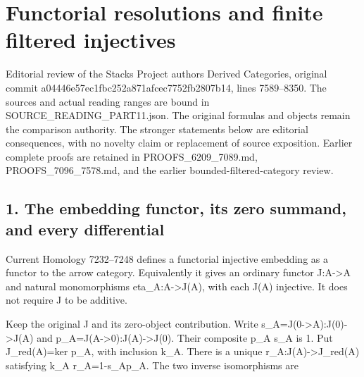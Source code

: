 \section{Functorial resolutions and finite filtered injectives}\label{proofs-7589-8350-functorial-resolutions-and-finite-filtered-injectives}

Editorial review of the Stacks Project authors\textquotesingle{} Derived Categories,\allowbreak{} original commit a04446e5\allowbreak{}7ec1fbc2\allowbreak{}52a871af\allowbreak{}cec7752f\allowbreak{}b2807b14, lines 7589–\allowbreak{}8350. The sources and actual reading ranges are bound in SOURCE\_\allowbreak{}READING\_\allowbreak{}PART11.json. The original formulas and objects remain the comparison authority. The stronger statements below are editorial consequences,\allowbreak{} with no novelty claim or replacement of source exposition. Earlier complete proofs are retained in PROOFS\_\allowbreak{}6209\_\allowbreak{}7089.md,\allowbreak{} PROOFS\_\allowbreak{}7096\_\allowbreak{}7578.md,\allowbreak{} and the earlier bounded-filtered-category review.

\subsection{\texorpdfstring{1. The embedding functor,\allowbreak{} its zero summand,\allowbreak{} and every differential}{1. The embedding  its zero  and every differential}}\label{proofs-7589-8350-the-embedding-functor-its-zero-summand-and-every-differential}

Current Homology 7232–\allowbreak{}7248 defines a functorial injective embedding as a functor to the arrow category. Equivalently it gives an ordinary functor J:\allowbreak{}A\allowbreak{}->A and natural monomorphisms eta\_\allowbreak{}A:\allowbreak{}A\allowbreak{}->J(A)\allowbreak{},\allowbreak{} with each J(A)\allowbreak{} injective. It does not require J to be additive.

Keep the original J and its zero-object contribution. Write s\_\allowbreak{}A\allowbreak{}=J(0\allowbreak{}->A)\allowbreak{}:\allowbreak{}J(0)\allowbreak{}\allowbreak{}->J(A)\allowbreak{} and p\_\allowbreak{}A\allowbreak{}=J(A\allowbreak{}->0)\allowbreak{}:\allowbreak{}J(A)\allowbreak{}\allowbreak{}->J(0)\allowbreak{}. Their composite p\_\allowbreak{}A s\_\allowbreak{}A is 1. Put J\_\allowbreak{}red(A)\allowbreak{}\allowbreak{}=ker p\_\allowbreak{}A,\allowbreak{} with inclusion k\_\allowbreak{}A. There is a unique r\_\allowbreak{}A:\allowbreak{}J(A)\allowbreak{}\allowbreak{}->J\_\allowbreak{}red(A)\allowbreak{} satisfying k\_\allowbreak{}A r\_\allowbreak{}A\allowbreak{}=1-s\_\allowbreak{}Ap\_\allowbreak{}A. The two inverse isomorphisms are

